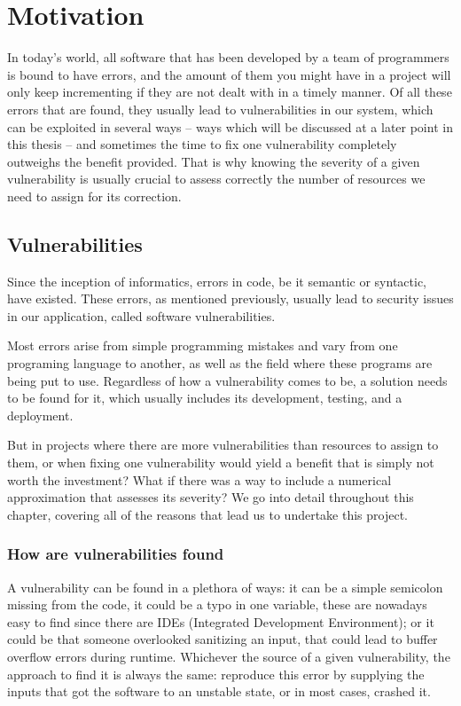 
\chapter{Motivation}\label{chapter:Motivation}

In today's world, all software that has been developed by a team of programmers is bound to have errors, and the amount of them you might have in a project will only keep incrementing if they are not dealt with in a timely manner. Of all these errors that are found, they usually lead to vulnerabilities in our system, which can be exploited in several ways -- ways which will be discussed at a later point in this thesis -- and sometimes the time to fix one vulnerability completely outweighs the benefit provided. That is why knowing the severity of a given vulnerability is usually crucial to assess correctly the number of resources we need to assign for its correction.

\section{Vulnerabilities}
Since the inception of informatics, errors in code, be it semantic or syntactic, have existed. These errors, as mentioned previously, usually lead to security issues in our application, called software vulnerabilities.

Most errors arise from simple programming mistakes and vary from one programing language to another, as well as the field where these programs are being put to use. Regardless of how a vulnerability comes to be, a solution needs to be found for it, which usually includes its development, testing, and a deployment.

But in projects where there are more vulnerabilities than resources to assign to them, or when fixing one vulnerability would yield a benefit that is simply not worth the investment? What if there was a way to include a numerical approximation that assesses its severity? We go into detail throughout this chapter, covering all of the reasons that lead us to undertake this project.

\subsection{How are vulnerabilities found}

A vulnerability can be found in a plethora of ways: it can be a simple semicolon missing from the code, it could be a typo in one variable, these are nowadays easy to find since there are IDEs (Integrated Development Environment); or it could be that someone overlooked sanitizing an input, that could lead to buffer overflow errors during runtime. Whichever the source of a given vulnerability, the approach to find it is always the same: reproduce this error by supplying the inputs that got the software to an unstable state, or in most cases, crashed it.

